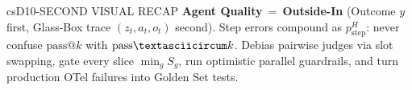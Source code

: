 \documentclass[../../../../master.tex]{subfiles}
\begin{document}
\begin{cscolumns}
\begin{cscard}{csD}{10-SECOND VISUAL RECAP}
  \sffamily\footnotesize
  \textbf{Agent Quality} \,=\, \textbf{Outside-In} (Outcome $y$ first, Glass-Box trace $(z_t,a_t,o_t)$ second).
  Step errors compound as $p_{\mathrm{step}}^H$: never confuse $\mathrm{pass@}k$ with $\mathrm{pass\textasciicircum}k$.
  Debias pairwise judges via slot swapping, gate every slice $\min_g S_g$, run optimistic parallel guardrails, and turn production OTel failures into Golden Set tests.
\end{cscard}
\end{cscolumns}

\csend
\end{document}
